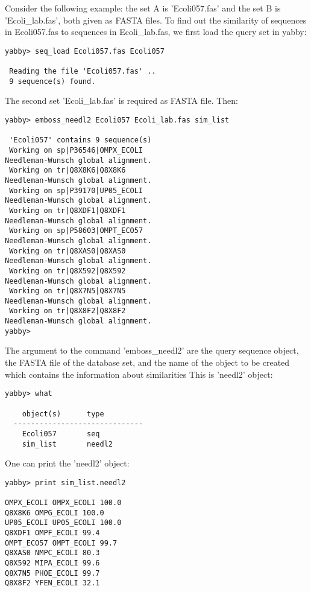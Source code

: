 Consider the following example: the set A is 'Ecoli057.fas'
and the set B is 'Ecoli\_lab.fas', both given as FASTA files.
To find out the similarity of sequences in Ecoli057.fas
to sequences in Ecoli\_lab.fas, we first load the query set
in yabby:

\begin{verbatim}
yabby> seq_load Ecoli057.fas Ecoli057

 Reading the file 'Ecoli057.fas' ..
 9 sequence(s) found.
\end{verbatim}

The second set 'Ecoli\_lab.fas' is required as FASTA file.
Then:

\begin{verbatim}
yabby> emboss_needl2 Ecoli057 Ecoli_lab.fas sim_list

 'Ecoli057' contains 9 sequence(s)
 Working on sp|P36546|OMPX_ECOLI
Needleman-Wunsch global alignment.
 Working on tr|Q8X8K6|Q8X8K6
Needleman-Wunsch global alignment.
 Working on sp|P39170|UP05_ECOLI
Needleman-Wunsch global alignment.
 Working on tr|Q8XDF1|Q8XDF1
Needleman-Wunsch global alignment.
 Working on sp|P58603|OMPT_ECO57
Needleman-Wunsch global alignment.
 Working on tr|Q8XAS0|Q8XAS0
Needleman-Wunsch global alignment.
 Working on tr|Q8X592|Q8X592
Needleman-Wunsch global alignment.
 Working on tr|Q8X7N5|Q8X7N5
Needleman-Wunsch global alignment.
 Working on tr|Q8X8F2|Q8X8F2
Needleman-Wunsch global alignment.
yabby>
\end{verbatim}

The argument to the command  'emboss\_needl2' are the query sequence
object, the FASTA file of the database set, and the name of the
object to be created which contains the information about similarities
This is 'needl2' object:
 
\begin{verbatim}
yabby> what

    object(s)      type
  ------------------------------
    Ecoli057       seq
    sim_list       needl2
\end{verbatim}

One can print the 'needl2' object:

\begin{verbatim}
yabby> print sim_list.needl2

OMPX_ECOLI OMPX_ECOLI 100.0
Q8X8K6 OMPG_ECOLI 100.0
UP05_ECOLI UP05_ECOLI 100.0
Q8XDF1 OMPF_ECOLI 99.4
OMPT_ECO57 OMPT_ECOLI 99.7
Q8XAS0 NMPC_ECOLI 80.3
Q8X592 MIPA_ECOLI 99.6
Q8X7N5 PHOE_ECOLI 99.7
Q8X8F2 YFEN_ECOLI 32.1
\end{verbatim}


